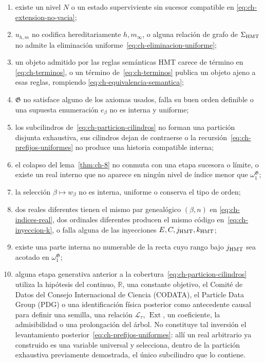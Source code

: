 \begin{enumerate}
\item existe un nivel \(N\) o un estado superviviente sin sucesor compatible en
\eqref{eq:ch-extension-no-vacia};
\item \(u_{h,m}\) no codifica hereditariamente \(h,m_\infty\), o alguna relación
de grafo de \(\Sigma_{\rm HMT}\) no admite la eliminación uniforme~\eqref{eq:ch-eliminacion-uniforme};
\item un objeto admitido por las reglas semánticas HMT carece de término en
\eqref{eq:ch-terminos}, o un término de~\eqref{eq:ch-terminos} publica un objeto ajeno a esas reglas, rompiendo
\eqref{eq:ch-equivalencia-semantica};
\item \(\mathfrak G\) no satisface alguno de los axiomas usados, falla su buen
orden definible o una supuesta enumeración \(e_\beta\) no es interna y
uniforme;
\item los subcilindros de~\eqref{eq:ch-particion-cilindros} no forman una partición disjunta exhaustiva, sus
cilindros dejan de contraerse o la recursión~\eqref{eq:ch-prefijos-uniformes} no produce una
historia compatible interna;
\item el colapso del lema~\ref{thm:ch-8} no conmuta con una etapa sucesora o límite, o existe
un real interno que no aparece en ningún nivel de índice menor que
\(\omega_1^{\mathfrak G}\);
\item la selección \(\beta\mapsto w_\beta\) no es interna, uniforme o conserva
el tipo de orden;
\item dos reales diferentes tienen el mismo par genealógico \((\beta,n)\) en
\eqref{eq:ch-indices-real}, dos ordinales diferentes producen el mismo código en~\eqref{eq:ch-inyeccion-k}, o falla
alguna de las inyecciones \(E,C,j_{\rm HMT},k_{\rm HMT}\);
\item existe una parte interna no numerable de la recta cuyo rango bajo
\(j_{\rm HMT}\) sea acotado en \(\omega_1^{\mathfrak G}\);
\item alguna etapa generativa anterior a la cobertura~\eqref{eq:ch-particion-cilindros} utiliza la hipótesis del continuo,
\(\mathbb R\), una constante objetivo, el Comité de Datos del Consejo
Internacional de Ciencia (CODATA), el Particle Data Group (PDG) o una identificación física
posterior como antecedente causal para definir una semilla, una relación
\(\mathscr L_\tau\), \(\operatorname{Ext}\), un coeficiente, la admisibilidad
o una prolongación del árbol. No constituye tal inversión el levantamiento
posterior~\eqref{eq:ch-prefijos-uniformes}: allí un real arbitrario ya construido es una variable
universal y selecciona, dentro de la partición exhaustiva previamente
demostrada, el único subcilindro que lo contiene.
\end{enumerate}

